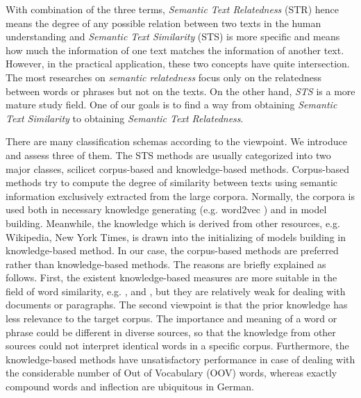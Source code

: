 With combination of the three terms, \textit{Semantic Text Relatedness} (STR) hence means the degree of any possible relation between two texts in the human understanding and \textit{Semantic Text Similarity} (STS) is more specific and means how much the information of one text matches the information of another text. However, in the practical application, these two concepts have quite intersection. The most researches on \textit{semantic relatedness} \citep{rohrbach2010helps, gracia2008web, gabrilovich2007computing} focus only on the relatedness between words or phrases but not on the texts. On the other hand, \textit{STS} is a more mature study field. One of our goals is to find a way from obtaining \textit{Semantic Text Similarity} to obtaining \textit{Semantic Text Relatedness}. 

There are many classification schemas according to the viewpoint. We introduce and assess three of them. The STS methods are usually categorized into two major classes, scilicet corpus-based and knowledge-based methods. Corpus-based methods try to compute the degree of similarity between texts using semantic information exclusively extracted from the large corpora. Normally, the corpora is used both in necessary knowledge generating (e.g. word2vec \cite{mikolov2013efficient}) and in model building. Meanwhile, the knowledge which is derived from other resources, e.g. Wikipedia, New York Times, is drawn into the initializing of models building in knowledge-based method. In our case, the corpus-based methods are preferred rather than knowledge-based methods. The reasons are briefly explained as follows. First, the existent knowledge-based measures are more suitable in the field of word similarity, e.g. \cite{jiang1997semantic}, \cite{strube2006wikirelate} and \cite{Agirre2009ta}, but they are relatively weak for dealing with documents or paragraphs. The second viewpoint is that the prior knowledge has less relevance to the target corpus. The importance and meaning of a word or phrase could be different in diverse sources, so that the knowledge from other sources could not interpret identical words in a specific corpus. Furthermore, the knowledge-based methods have unsatisfactory performance in case of dealing with the considerable number of Out of Vocabulary (OOV) words, whereas exactly compound words and inflection are ubiquitous in German. 

